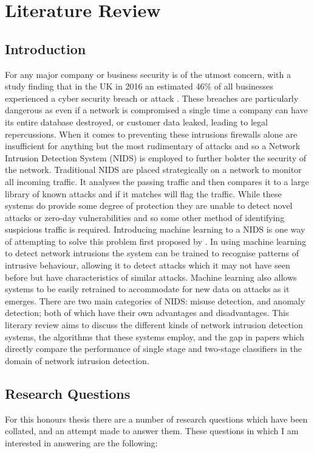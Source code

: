 \section{Literature Review}

	\subsection{Introduction}
		For any major company or business security is of the utmost concern, with a study finding that in the UK in 2016 an estimated 46\% of all businesses experienced a cyber security breach or attack \cite{securitysurvey2017}. These breaches are particularly dangerous as even if a network is compromised a single time a company can have its entire database destroyed, or customer data leaked, leading to legal repercussions. When it comes to preventing these intrusions firewalls alone are insufficient for anything but the most rudimentary of attacks and so a Network Intrusion Detection System (NIDS) is employed to further bolster the security of the network. Traditional NIDS are placed strategically on a network to monitor all incoming traffic. It analyses the passing traffic and then compares it to a large library of known attacks and if it matches will flag the traffic. While these systems do provide some degree of protection they are unable to detect novel attacks or zero-day vulnerabilities and so some other method of identifying suspicious traffic is required. Introducing machine learning to a NIDS is one way of attempting to solve this problem first proposed by \cite{denning1987intrusion}. In using machine learning to detect network intrusions the system can be trained to recognise patterns of intrusive behaviour, allowing it to detect attacks which it may not have seen before but have characteristics of similar attacks. Machine learning also allows systems to be easily retrained to accommodate for new data on attacks as it emerges. There are two main categories of NIDS: misuse detection, and anomaly detection; both of which have their own advantages and disadvantages. This literary review aims to discuss the different kinds of network intrusion detection systems, the algorithms that these systems employ, and the gap in papers which directly compare the performance of single stage and two-stage classifiers in the domain of network intrusion detection.
		
	\subsection{Research Questions}
		For this honours thesis there are a number of research questions which have been collated, and an attempt made to answer them. These questions in which I am interested in answering are the following: 
		
